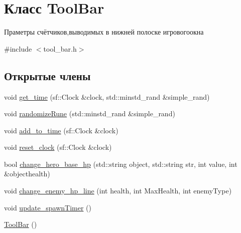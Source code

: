 \hypertarget{classToolBar}{}\section{Класс Tool\+Bar}
\label{classToolBar}


Праметры счётчиков,выводимых в нижней полоске игровогоокна  




{\ttfamily \#include $<$tool\+\_\+bar.\+h$>$}

\subsection*{Открытые члены}
\begin{DoxyCompactItemize}
\item 
void \hyperlink{classToolBar_acb6ec6dffc23783cd110667e3a012c2a}{get\+\_\+time} (sf\+::\+Clock \&clock, std\+::minstd\+\_\+rand \&simple\+\_\+rand)
\item 
void \hyperlink{classToolBar_a704da8346e935b2724aba9d80bbdd66b}{randomize\+Rune} (std\+::minstd\+\_\+rand \&simple\+\_\+rand)
\item 
void \hyperlink{classToolBar_ae8d52640262d6e25d07e65ad5cfe8a54}{add\+\_\+to\+\_\+time} (sf\+::\+Clock \&clock)
\item 
void \hyperlink{classToolBar_a6c030d2393dd9ad33fb51e59b9ae9d6b}{reset\+\_\+clock} (sf\+::\+Clock \&clock)
\item 
bool \hyperlink{classToolBar_a7f2fbad05b0511c585283fe5377c6096}{change\+\_\+hero\+\_\+base\+\_\+hp} (std\+::string object, std\+::string str, int value, int \&objecthealth)
\item 
void \hyperlink{classToolBar_a4cc86d8767581aaa437f851d5782c61e}{change\+\_\+enemy\+\_\+hp\+\_\+line} (int health, int Max\+Health, int enemy\+Type)
\item 
void \hyperlink{classToolBar_a6b8c6075b58347e259cabf177adfd687}{update\+\_\+spawn\+Timer} ()
\item 
\hyperlink{classToolBar_a998467428b7984217db78653412f2c68}{Tool\+Bar} ()
\end{DoxyCompactItemize}
